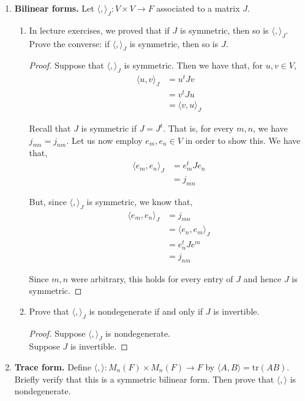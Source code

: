 \documentclass[11pt, reqno]{amsart}
\theoremstyle{plain}
\theoremstyle{definition}
\theoremstyle{example}
\def\<{\langle} \def\>{\rangle}
\def\tr{\mathrm{tr}}
\begin{document}
\begin{enumerate}[1.]
\item \textbf{Bilinear forms.} Let $\<,\>_J: V \times V \to F$ associated to a matrix $J$. 
\begin{enumerate}
\item\label{hint1} In lecture exercises, we proved that if $J$ is symmetric, then so is $\<,\>_J$. \\
Prove the converse: if $\<,\>_J$ is symmetric, then so is $J$. 

\begin{proof}
Suppose that $\<, \>_J$ is symmetric. Then we have that, for $u, v \in V$,
\begin{align*}
\<u, v\>_J &= u^tJv\\
&= v^tJu\\
&= \<v, u\>_J
\end{align*}

Recall that $J$ is symmetric if $J = J^t$. That is, for every $m, n$, we have $j_{mn} = j_{nm}$. Let us now employ $e_m, e_n \in V$ in order to show this. We have that,
\begin{align*}
\<e_m, e_n\>_J &= e_m^t J e_n\\
&= j_{mn}
\end{align*}

But, since $\<, \>_J$ is symmetric, we know that,
\begin{align*}
\<e_m, e_n\>_J &= j_{mn}\\
&= \<e_n, e_m\>_J\\
&= e_n^t J e^m\\
&= j_{nm}
\end{align*}

Since $m, n$ were arbitrary, this holds for every entry of $J$ and hence $J$ is symmetric.
\end{proof}

\item\label{hint2} Prove that $\<,\>_J$ is nondegenerate if and only if $J$ is invertible. 

\begin{proof}
Suppose $\<,\>_J$ is nondegenerate.\\

Suppose $J$ is invertible.
\end{proof}

\end{enumerate}
\item\label{hint3}  \textbf{Trace form.} Define $\<, \>: M_n(F) \times M_n(F) \to F$ by $\<A,B\> = \tr(AB)$. Briefly verify that this is a symmetric bilinear form. Then prove that $\<,\>$ is nondegenerate.


\end{enumerate}
\end{document}
